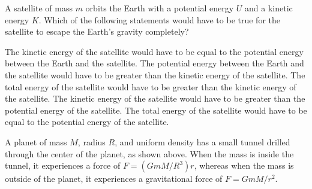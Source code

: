 \documentclass{../../../oss-apphys-exam}
\begin{document}
\begin{questions}
  \question A satellite of mass $m$ orbits the Earth with a potential energy
  $U$ and a kinetic energy $K$. Which of the following statements would have
  to be true for the satellite to escape the Earth's gravity completely?
  \begin{choices}
    \choice The kinetic energy of the satellite would have to be equal to the
    potential energy between the Earth and the satellite.
    \choice The potential energy between the Earth and the satellite would
    have to be greater than the kinetic energy of the satellite.
    \choice The total energy of the satellite would have to be greater than
    the kinetic energy of the satellite.
    \choice The kinetic energy of the satellite would have to be greater than
    the potential energy of the satellite.
    \choice The total energy of the satellite would have to be equal to the
    potential energy of the satellite.
  \end{choices}
  \newpage

  
  \question A planet of mass $M$, radius $R$, and uniform density has a small
  tunnel drilled through the center of the planet, as shown above. When the
  mass is inside the tunnel, it experiences a force of $F=(GmM/R^3)r$, whereas
  when the mass is outside of the planet, it experiences a gravitational force
  of $F=GmM/r^2$.
\end{questions}
\end{document}
